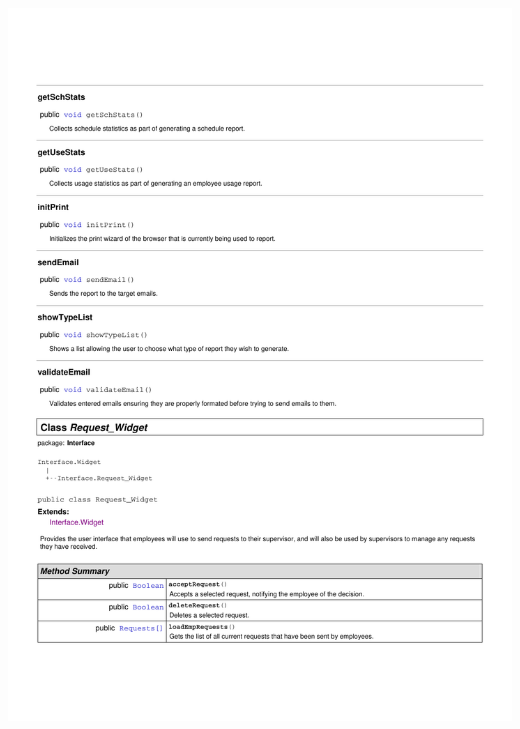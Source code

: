 \documentclass[letterpaper,12pt]{report}
\begin{document}
\includegraphics[scale=0.9,trim=20mm 30mm 25mm 25mm]{externals/InterfaceDataDictionary7.pdf}
\newpage
\end{document}
